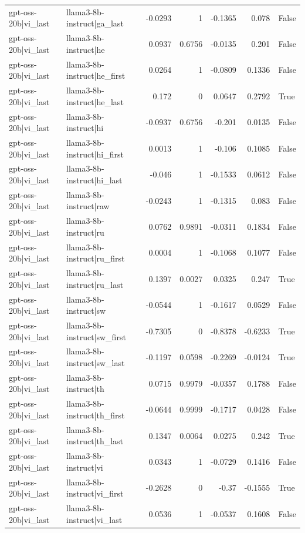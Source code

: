 \begin{table}
\begin{tabular}{l l r r r r l}
gpt-oss-20b|vi_last & llama3-8b-instruct|ga_last & -0.0293 & 1 & -0.1365 & 0.078 & False \\
gpt-oss-20b|vi_last & llama3-8b-instruct|he & 0.0937 & 0.6756 & -0.0135 & 0.201 & False \\
gpt-oss-20b|vi_last & llama3-8b-instruct|he_first & 0.0264 & 1 & -0.0809 & 0.1336 & False \\
gpt-oss-20b|vi_last & llama3-8b-instruct|he_last & 0.172 & 0 & 0.0647 & 0.2792 & True \\
gpt-oss-20b|vi_last & llama3-8b-instruct|hi & -0.0937 & 0.6756 & -0.201 & 0.0135 & False \\
gpt-oss-20b|vi_last & llama3-8b-instruct|hi_first & 0.0013 & 1 & -0.106 & 0.1085 & False \\
gpt-oss-20b|vi_last & llama3-8b-instruct|hi_last & -0.046 & 1 & -0.1533 & 0.0612 & False \\
gpt-oss-20b|vi_last & llama3-8b-instruct|raw & -0.0243 & 1 & -0.1315 & 0.083 & False \\
gpt-oss-20b|vi_last & llama3-8b-instruct|ru & 0.0762 & 0.9891 & -0.0311 & 0.1834 & False \\
gpt-oss-20b|vi_last & llama3-8b-instruct|ru_first & 0.0004 & 1 & -0.1068 & 0.1077 & False \\
gpt-oss-20b|vi_last & llama3-8b-instruct|ru_last & 0.1397 & 0.0027 & 0.0325 & 0.247 & True \\
gpt-oss-20b|vi_last & llama3-8b-instruct|sw & -0.0544 & 1 & -0.1617 & 0.0529 & False \\
gpt-oss-20b|vi_last & llama3-8b-instruct|sw_first & -0.7305 & 0 & -0.8378 & -0.6233 & True \\
gpt-oss-20b|vi_last & llama3-8b-instruct|sw_last & -0.1197 & 0.0598 & -0.2269 & -0.0124 & True \\
gpt-oss-20b|vi_last & llama3-8b-instruct|th & 0.0715 & 0.9979 & -0.0357 & 0.1788 & False \\
gpt-oss-20b|vi_last & llama3-8b-instruct|th_first & -0.0644 & 0.9999 & -0.1717 & 0.0428 & False \\
gpt-oss-20b|vi_last & llama3-8b-instruct|th_last & 0.1347 & 0.0064 & 0.0275 & 0.242 & True \\
gpt-oss-20b|vi_last & llama3-8b-instruct|vi & 0.0343 & 1 & -0.0729 & 0.1416 & False \\
gpt-oss-20b|vi_last & llama3-8b-instruct|vi_first & -0.2628 & 0 & -0.37 & -0.1555 & True \\
gpt-oss-20b|vi_last & llama3-8b-instruct|vi_last & 0.0536 & 1 & -0.0537 & 0.1608 & False \\

\end{tabular}
\end{table}
